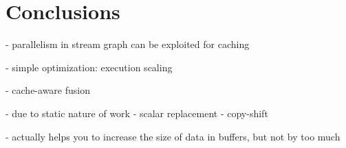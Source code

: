 \section{Conclusions}
\label{sec:conclusion}

- parallelism in stream graph can be exploited for caching

- simple optimization: execution scaling

- cache-aware fusion

- due to static nature of work 
- scalar replacement
- copy-shift

- actually helps you to increase the size of data in buffers, but not
  by too much
